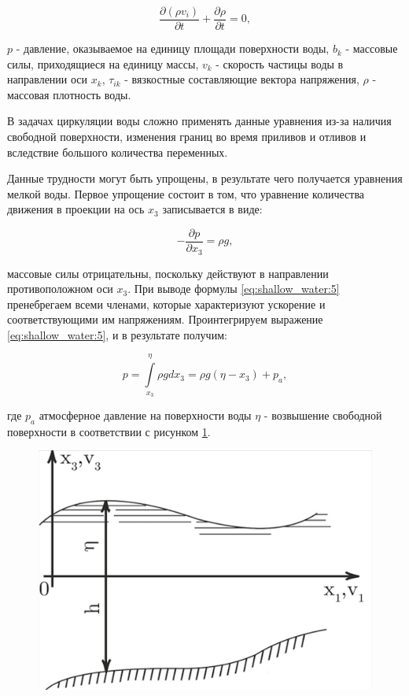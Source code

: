 \documentclass[14pt]{extreport}
\begin{document}
\begin{equation}\label{eq:shallow_water:4}
\frac{\partial (\rho v_i)}{\partial t} + \frac{\partial \rho}{\partial t}=0,
\end{equation}

 $ p $ - давление, оказываемое на единицу площади поверхности воды, $ b_k $ - массовые силы, приходящиеся на единицу массы, $v_k$ - скорость частицы воды в направлении оси $x_k$, $\tau_{ik}$ - вязкостные составляющие вектора напряжения, $ \rho $ - массовая плотность воды.

В задачах циркуляции воды сложно применять данные уравнения из-за наличия свободной поверхности, изменения границ во время приливов и отливов и вследствие большого количества переменных.

Данные трудности могут быть упрощены, в результате чего получается уравнения мелкой воды. Первое упрощение состоит в том, что уравнение количества движения в проекции на ось $x_3$ записывается в виде:

\begin{equation}\label{eq:shallow_water:5}
-\frac{\partial p}{\partial x_3}=\rho g, 
\end{equation}

 массовые силы отрицательны, поскольку действуют в направлении противоположном оси $ x_3 $. При выводе формулы \ref{eq:shallow_water:5} пренебрегаем всеми членами, которые характеризуют ускорение и соответствующими им напряжениям. Проинтегрируем выражение \ref{eq:shallow_water:5}, и в результате получим:

\begin{equation}\label{eq:shallow_water:6}
p = \int\limits^\eta_{x_3} \rho g dx_3 = \rho g (\eta-x_3)+p_a,
\end{equation}

\noindent где $p_a$ атмосферное давление на поверхности воды
$\eta$ - возвышение свободной поверхности в соответствии с рисунком \ref{img:shallow_water:1}.

\begin{figure}[H]
\centerline{\includegraphics[width=0.5\linewidth]{images/shallow_water_1}}
\caption{}
\label{img:shallow_water:1}
\end{figure}
\end{document}
